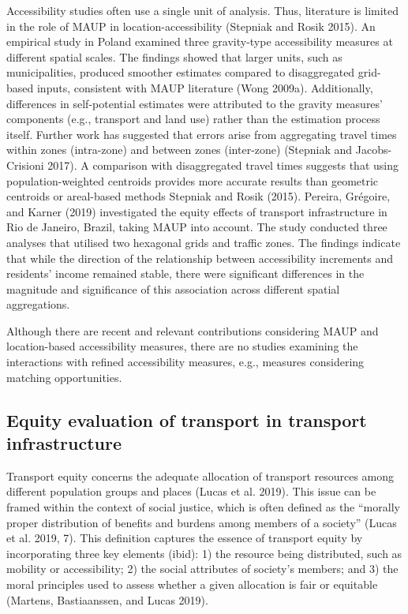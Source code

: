 \documentclass{article}
\begin{document}
Accessibility studies often use a single unit of analysis. Thus,
literature is limited in the role of MAUP in location-accessibility
(Stepniak and Rosik 2015). An empirical study in Poland examined three
gravity-type accessibility measures at different spatial scales. The
findings showed that larger units, such as municipalities, produced
smoother estimates compared to disaggregated grid-based inputs,
consistent with MAUP literature (Wong 2009a). Additionally, differences
in self-potential estimates were attributed to the gravity measures'
components (e.g., transport and land use) rather than the estimation
process itself. Further work has suggested that errors arise from
aggregating travel times within zones (intra-zone) and between zones
(inter-zone) (Stepniak and Jacobs-Crisioni 2017). A comparison with
disaggregated travel times suggests that using population-weighted
centroids provides more accurate results than geometric centroids or
areal-based methods Stepniak and Rosik (2015). Pereira, Grégoire, and
Karner (2019) investigated the equity effects of transport
infrastructure in Rio de Janeiro, Brazil, taking MAUP into account. The
study conducted three analyses that utilised two hexagonal grids and
traffic zones. The findings indicate that while the direction of the
relationship between accessibility increments and residents' income
remained stable, there were significant differences in the magnitude and
significance of this association across different spatial aggregations.

Although there are recent and relevant contributions considering MAUP
and location-based accessibility measures, there are no studies
examining the interactions with refined accessibility measures, e.g.,
measures considering matching opportunities.

\subsection{Equity evaluation of transport in transport
infrastructure}\label{equity-evaluation-of-transport-in-transport-infrastructure}

Transport equity concerns the adequate allocation of transport resources
among different population groups and places (Lucas et al. 2019). This
issue can be framed within the context of social justice, which is often
defined as the ``morally proper distribution of benefits and burdens
among members of a society'' (Lucas et al. 2019, 7). This definition
captures the essence of transport equity by incorporating three key
elements (ibid): 1) the resource being distributed, such as mobility or
accessibility; 2) the social attributes of society's members; and 3) the
moral principles used to assess whether a given allocation is fair or
equitable (Martens, Bastiaanssen, and Lucas 2019).
\end{document}
